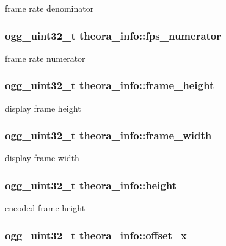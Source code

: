 frame rate denominator \hypertarget{structtheora__info_a3478199aa5ab213816c1819f70085ad7}{
\subsubsection[{fps\+\_\+numerator}]{\setlength{\rightskip}{0pt plus 5cm}ogg\+\_\+uint32\+\_\+t theora\+\_\+info\+::fps\+\_\+numerator}}\label{structtheora__info_a3478199aa5ab213816c1819f70085ad7}
frame rate numerator \hypertarget{structtheora__info_a287e4c194f1d2e6deb39d59f1748ea48}{
\subsubsection[{frame\+\_\+height}]{\setlength{\rightskip}{0pt plus 5cm}ogg\+\_\+uint32\+\_\+t theora\+\_\+info\+::frame\+\_\+height}}\label{structtheora__info_a287e4c194f1d2e6deb39d59f1748ea48}
display frame height \hypertarget{structtheora__info_a8f28f4018a25634d40e4ae861fbbccfa}{
\subsubsection[{frame\+\_\+width}]{\setlength{\rightskip}{0pt plus 5cm}ogg\+\_\+uint32\+\_\+t theora\+\_\+info\+::frame\+\_\+width}}\label{structtheora__info_a8f28f4018a25634d40e4ae861fbbccfa}
display frame width \hypertarget{structtheora__info_ae6f0274fc4a7f285c422d91abb35f9c6}{
\subsubsection[{height}]{\setlength{\rightskip}{0pt plus 5cm}ogg\+\_\+uint32\+\_\+t theora\+\_\+info\+::height}}\label{structtheora__info_ae6f0274fc4a7f285c422d91abb35f9c6}
encoded frame height \hypertarget{structtheora__info_af5949a02bef29512f2705e6f6c944e3b}{
\subsubsection[{offset\+\_\+x}]{\setlength{\rightskip}{0pt plus 5cm}ogg\+\_\+uint32\+\_\+t theora\+\_\+info\+::offset\+\_\+x}}\label{structtheora__info_af5949a02bef29512f2705e6f6c944e3b}
